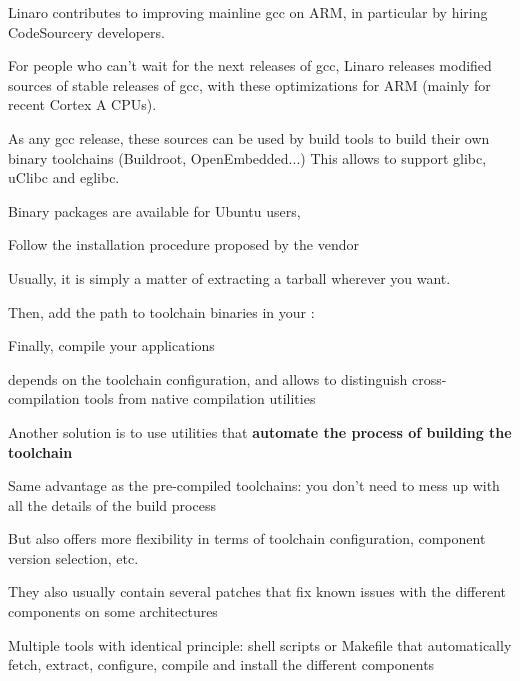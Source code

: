     \startitemize
    \item Linaro contributes to improving mainline gcc on ARM, in
      particular by hiring CodeSourcery developers.
    \item For people who can't wait for the next releases of gcc, Linaro
      releases modified sources of stable releases of gcc, with these
      optimizations for ARM (mainly for recent Cortex A CPUs).
    \item As any gcc release, these sources can be used by build tools
      to build their own binary toolchains (Buildroot, OpenEmbedded...)
      This allows to support glibc, uClibc and eglibc.
    \item {}
    \item Binary packages are available for Ubuntu users,
    \stopitemize


  \startitemize
  \item Follow the installation procedure proposed by the vendor
  \item Usually, it is simply a matter of extracting a tarball
        wherever you want.
  \item Then, add the path to toolchain binaries in your :\\
  \item Finally, compile your applications\\
  \item {} depends on the toolchain configuration, and
    allows to distinguish cross-compilation tools from native
    compilation utilities
  \stopitemize

  Another solution is to use utilities that {\bf automate the process of
  building the toolchain}
  \startitemize
  \item Same advantage as the pre-compiled toolchains: you don't need
    to mess up with all the details of the build process
  \item But also offers more flexibility in terms of toolchain
    configuration, component version selection, etc.
  \item They also usually contain several patches that fix known
    issues with the different components on some architectures
  \item Multiple tools with identical principle: shell scripts or
    Makefile that automatically fetch, extract, configure, compile and
    install the different components
\stopitemize

